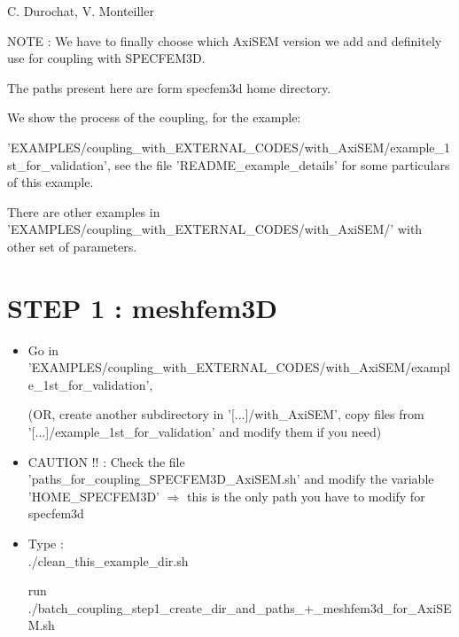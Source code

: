 \documentclass[11pt]{article}
\date{}
\begin{document}
{\huge { }}

\bigskip
\bigskip
\bigskip

 C. Durochat, V. Monteiller

\bigskip
\bigskip

\noindent NOTE : We have to finally choose which AxiSEM version we add and definitely use for coupling with SPECFEM3D.

\medskip

\noindent The paths present here are form specfem3d home directory.

\medskip


\medskip

\noindent We show the process of the coupling, for the example:

\noindent 'EXAMPLES/coupling\_with\_EXTERNAL\_CODES/with\_AxiSEM/example\_1st\_for\_validation', see the file 'README\_example\_details' for some particulars of this example.

\medskip

\noindent There are other examples in 'EXAMPLES/coupling\_with\_EXTERNAL\_CODES/with\_AxiSEM/' with other set of parameters.

\bigskip

\section{STEP 1 : meshfem3D}

\begin{itemize}

\item[\textbullet] Go in 'EXAMPLES/coupling\_with\_EXTERNAL\_CODES/with\_AxiSEM/example\_1st\_for\_validation',

\smallskip

(OR, create another subdirectory in '[...]/with\_AxiSEM', copy files from '[...]/example\_1st\_for\_validation' and modify them if you need)

\item[\textbullet] {\color{red} CAUTION !! : Check the file 'paths\_for\_coupling\_SPECFEM3D\_AxiSEM.sh' and modify the variable 'HOME\_SPECFEM3D'} $\Longrightarrow$ this is the only path you have to modify for specfem3d

\item[\textbullet] Type : \\

\noindent ./clean\_this\_example\_dir.sh

\smallskip

\noindent run ./batch\_coupling\_step1\_create\_dir\_and\_paths\_+\_meshfem3d\_for\_AxiSEM.sh

\end{itemize}
\end{document}
